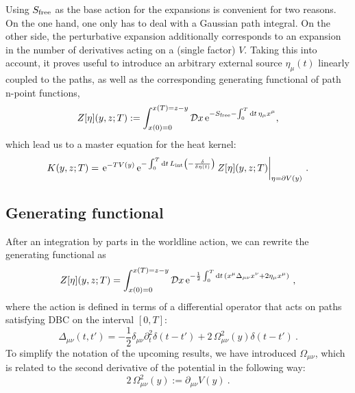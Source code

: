\documentclass[12pt,a4paper]{article}
\numberwithin{equation}{section}
\numberwithin{equation}{section}
\begin{document}
Using $S_{\rm free}$ as the base action for the expansions is convenient for two reasons. On the one hand, one only has to deal with a Gaussian path integral. On the other side, the perturbative expansion additionally corresponds to an expansion in the number of derivatives acting on a (single factor) $V$. 
Taking this into account, it proves useful to introduce an arbitrary external source $\eta_{\mu}(t)$ linearly coupled to the paths, as well as the corresponding generating functional of path n-point functions,
\begin{equation}
Z[\eta](y,z;T):= \int_{x(0)=0}^{x(T)=z-y} \mathcal{D}x \, \mathrm{e}^{-S_{\mathrm{free}}-\int_{0}^{T} {\rm d}t \, \eta_\mu x^\mu},
\end{equation}
which lead us to a master equation for the heat kernel:
\begin{equation} \label{HK2}
{K(y,z;T)=\left.\mathrm{e}^{-T V(y)} \, \mathrm{e}^{-\int_0^T {\rm d}t \, L_{\mathrm{int}}\left(-\frac{\delta}{\delta \eta(t)} \right)} \, Z[\eta](y,z;T)\right|_{\eta=\partial V(y)}}\ .
\end{equation}


\subsection{Generating functional} \label{sec2.1}
After an integration by parts in the worldline action, we can rewrite the generating functional as
\begin{equation} \label{gen}
Z[\eta](y,z;T)= \int_{x(0)=0}^{x(T)=z-y} \mathcal{D}x \, \mathrm{e}^{-\frac12 \int_{0}^{T} {\rm d}t \, \left(x^\mu \Delta_{\mu\nu} x^\nu+2\eta_\mu x^\mu \right)}\ ,
\end{equation}
where the action is defined in terms of a differential operator that acts on paths satisfying DBC on the interval $[0,T]$:
\begin{equation} \label{Delta}
{\Delta_{\mu\nu} (t,t')=-\frac12 \delta_{\mu\nu}\partial^2_t\delta(t-t')+2 \, \Omega^2_{\mu\nu}(y)\delta(t-t')}\ .
\end{equation}
To simplify the notation of the upcoming results, we have introduced $\Omega_{\mu\nu}$, which is related to the second derivative of the potential in the following way:
\begin{equation} \label{Omega}
{2 \, \Omega^2_{\mu\nu}(y):=\partial_{\mu\nu} V(y)}\ .
\end{equation}
\end{document}

